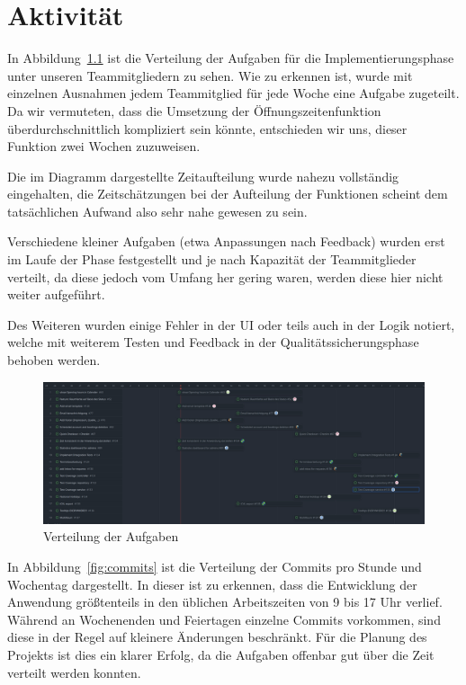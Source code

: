 
\chapter{Aktivität}
\label{chap:activity}

In Abbildung~\ref{fig:tasks} ist die Verteilung der Aufgaben für die Implementierungsphase unter unseren Teammitgliedern zu sehen.
Wie zu erkennen ist, wurde mit einzelnen Ausnahmen jedem Teammitglied für jede Woche eine Aufgabe zugeteilt.
Da wir vermuteten, dass die Umsetzung der Öffnungszeitenfunktion überdurchschnittlich kompliziert sein könnte,
entschieden wir uns, dieser Funktion zwei Wochen zuzuweisen.

Die im Diagramm dargestellte Zeitaufteilung wurde nahezu vollständig eingehalten,
die Zeitschätzungen bei der Aufteilung der Funktionen scheint dem tatsächlichen Aufwand also sehr nahe gewesen zu sein.

Verschiedene kleiner Aufgaben (etwa Anpassungen nach Feedback) wurden erst im Laufe der Phase festgestellt und je nach Kapazität der Teammitglieder verteilt, da diese jedoch vom Umfang her gering waren, werden diese hier nicht weiter aufgeführt.

Des Weiteren wurden einige Fehler in der \gls{UI} oder teils auch in der Logik notiert, welche mit weiterem Testen und Feedback in der Qualitätssicherungsphase behoben werden.

\begin{figure}[ht]
    \centering
    \includegraphics[width=\textwidth]{figures/tasks}
    \caption{Verteilung der Aufgaben}
    \label{fig:tasks}
\end{figure}

In Abbildung~\ref{fig:commits} ist die Verteilung der Commits pro Stunde und Wochentag dargestellt.
In dieser ist zu erkennen, dass die Entwicklung der Anwendung größtenteils in den üblichen Arbeitszeiten von 9 bis 17 Uhr verlief.
Während an Wochenenden und Feiertagen einzelne Commits vorkommen, sind diese in der Regel auf kleinere Änderungen beschränkt.
Für die Planung des Projekts ist dies ein klarer Erfolg, da die Aufgaben offenbar gut über die Zeit verteilt werden konnten.

